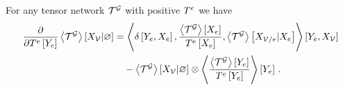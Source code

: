 \begin{lemma}\label{lem:difMNprob}
	For any tensor network $\mathcal{T}^{\mathcal{G}}$ with positive $T^{e}$ we have
	\begin{align*}
		\frac{\partial }{\partial T^{e}\left[Y_{e}\right]} \left\langle \mathcal{T}^{\mathcal{G}}\right\rangle \left[ X_{\mathcal{V}} | \varnothing \right]
		& = \left\langle 
	 	\delta\left[Y_{e},X_{e}\right], 
		\frac{\left\langle \mathcal{T}^{\mathcal{G}}\right\rangle \left[ X_{e} \right]}{T^{e}\left[X_{e}\right]}, 
		\left\langle \mathcal{T}^{\mathcal{G}}\right\rangle \left[ X_{\mathcal{V}/e} | X_{e} \right] \right\rangle \left[ Y_{e},X_{\mathcal{V}} \right] \\
		& \quad -  \left\langle \mathcal{T}^{\mathcal{G}}\right\rangle \left[ X_{\mathcal{V}} | \varnothing \right] \otimes \left\langle \frac{\left\langle \mathcal{T}^{\mathcal{G}}\right\rangle \left[ Y_{e} \right]}{T^{e}\left[Y_{e}\right]}
		\right\rangle \left[ Y_{e} \right] \, .
	\end{align*}
\end{lemma}
